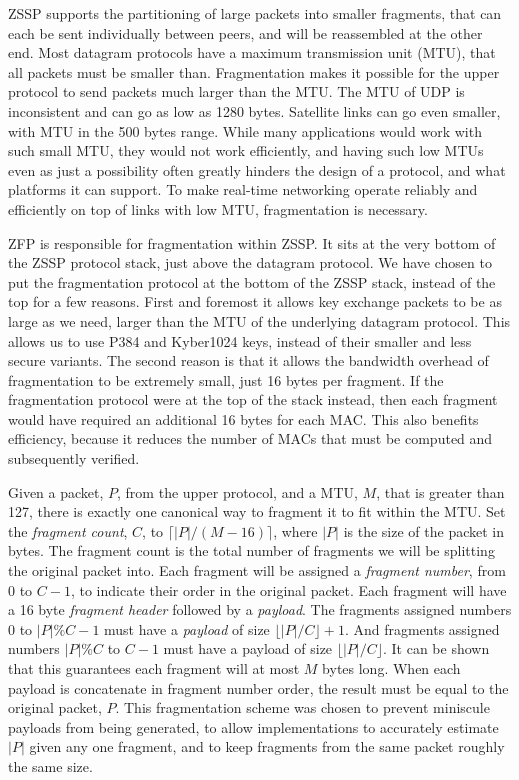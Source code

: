 \documentclass{article}
\begin{document}
ZSSP supports the partitioning of large packets into smaller fragments, that can each be sent individually between peers, and will be reassembled at the other end. Most datagram protocols have a maximum transmission unit (MTU), that all packets must be smaller than. Fragmentation makes it possible for the upper protocol to send packets much larger than the MTU. The MTU of UDP is inconsistent and can go as low as 1280 bytes. Satellite links can go even smaller, with MTU in the 500 bytes range. While many applications would work with such small MTU, they would not work efficiently, and having such low MTUs even as just a possibility often greatly hinders the design of a protocol, and what platforms it can support. To make real-time networking operate reliably and efficiently on top of links with low MTU, fragmentation is necessary.

ZFP is responsible for fragmentation within ZSSP. It sits at the very bottom of the ZSSP protocol stack, just above the datagram protocol. We have chosen to put the fragmentation protocol at the bottom of the ZSSP stack, instead of the top for a few reasons. First and foremost it allows key exchange packets to be as large as we need, larger than the MTU of the underlying datagram protocol. This allows us to use P384 and Kyber1024 keys, instead of their smaller and less secure variants. The second reason is that it allows the bandwidth overhead of fragmentation to be extremely small, just 16 bytes per fragment. If the fragmentation protocol were at the top of the stack instead, then each fragment would have required an additional 16 bytes for each MAC. This also benefits efficiency, because it reduces the number of MACs that must be computed and subsequently verified.

Given a packet, $P$, from the upper protocol, and a MTU, $M$, that is greater than 127, there is exactly one canonical way to fragment it to fit within the MTU. Set the \emph{fragment count}, $C$, to $\lceil|P|/(M - 16)\rceil$, where $|P|$ is the size of the packet in bytes. The fragment count is the total number of fragments we will be splitting the original packet into.  Each fragment will be assigned a \emph{fragment number}, from $0$ to $C - 1$, to indicate their order in the original packet. Each fragment will have a 16 byte \emph{fragment header} followed by a \emph{payload}. The fragments assigned numbers 0 to $|P|\%C - 1$ must have a \emph{payload} of size $\lfloor|P|/C\rfloor + 1$. And fragments assigned numbers $|P|\%C$ to $C - 1$ must have a payload of size $\lfloor|P|/C\rfloor$. It can be shown that this guarantees each fragment will at most $M$ bytes long. When each payload is concatenate in fragment number order, the result must be equal to the original packet, $P$. This fragmentation scheme was chosen to prevent miniscule payloads from being generated, to allow implementations to accurately estimate $|P|$ given any one fragment, and to keep fragments from the same packet roughly the same size.
\end{document}
